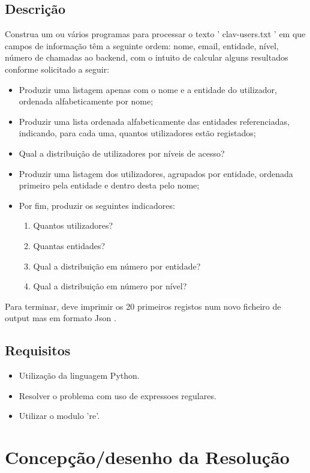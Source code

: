 \documentclass[11pt,a4paper]{report}%
\begin{document}
\section{Descrição} \label{sec:Descricao} %
Construa um ou vários programas
para processar o texto ' clav-users.txt ' em que campos de informação
têm a seguinte ordem: nome, email, entidade, nível, número de chamadas ao backend, com o intuito de calcular alguns
resultados conforme solicitado a seguir:
\begin{itemize}
\item Produzir uma listagem apenas com o nome e a entidade do utilizador, ordenada alfabeticamente por nome;
\item Produzir uma lista ordenada alfabeticamente das entidades referenciadas, indicando, para cada uma, quantos utilizadores estão registados;
\item Qual a distribuição de utilizadores por níveis de acesso?
\item Produzir uma listagem dos utilizadores, agrupados por entidade, ordenada primeiro pela entidade e dentro desta pelo nome;
\item Por fim, produzir os seguintes indicadores:
\begin{enumerate}[1.]
\item Quantos utilizadores?
\item Quantas entidades?
\item Qual a distribuição em número por entidade?
\item Qual a distribuição em número por nível?
\end{enumerate}
\end{itemize}
Para terminar, deve imprimir os 20 primeiros registos num novo ficheiro de output mas em formato Json .

\section{Requisitos} \label{sec:Requesitos}
\begin{itemize}
  \item Utilização da linguagem Python.
  \item Resolver o problema com uso de expressoes regulares.
  \item Utilizar o modulo 're'.
\end{itemize}


\chapter{Concepção/desenho da Resolução}
\end{document}
